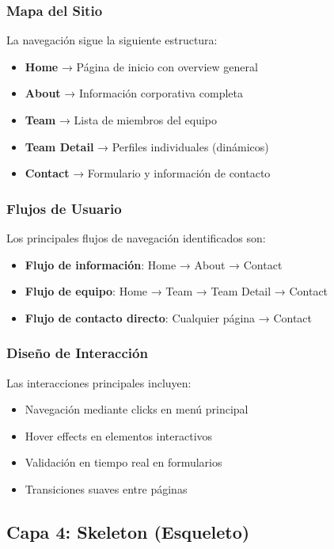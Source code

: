 \subsubsection{Mapa del Sitio}
La navegación sigue la siguiente estructura:

\begin{itemize}
    \item \textbf{Home} → Página de inicio con overview general
    \item \textbf{About} → Información corporativa completa
    \item \textbf{Team} → Lista de miembros del equipo
    \item \textbf{Team Detail} → Perfiles individuales (dinámicos)
    \item \textbf{Contact} → Formulario y información de contacto
\end{itemize}

\subsubsection{Flujos de Usuario}
Los principales flujos de navegación identificados son:

\begin{itemize}
    \item \textbf{Flujo de información}: Home → About → Contact
    \item \textbf{Flujo de equipo}: Home → Team → Team Detail → Contact
    \item \textbf{Flujo de contacto directo}: Cualquier página → Contact
\end{itemize}

\subsubsection{Diseño de Interacción}
Las interacciones principales incluyen:

\begin{itemize}
    \item Navegación mediante clicks en menú principal
    \item Hover effects en elementos interactivos
    \item Validación en tiempo real en formularios
    \item Transiciones suaves entre páginas
\end{itemize}

\subsection{Capa 4: Skeleton (Esqueleto)}

